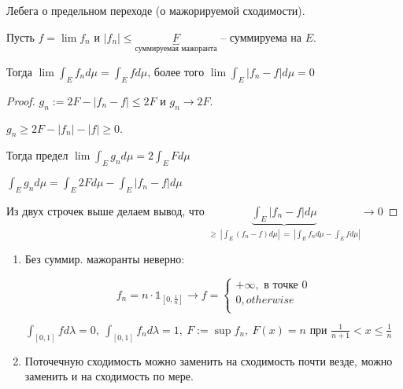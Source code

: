 \begin{theorem}
    Лебега о предельном переходе (о мажорируемой сходимости).

    Пусть $f = \lim{f_n}$ и $|f_n| \leq \underbrace{F}_{\text{суммируемая мажоранта}}$ -- суммируема на $E$.

    Тогда $\lim{\int_E{f_n d \mu}} = \int_E{f d \mu}$, более того $\lim{\int_E{|f_n - f|d \mu}} = 0$
\end{theorem}
\begin{proof}
    $g_n := 2F - |f_n - f| \leq 2F$ и $g_n \rightarrow 2F$.
    
    $g_n \geq 2F - |f_n| - |f| \geq 0$.

    Тогда предел $\lim{\int_E{g_n d \mu}} = 2 \int_E{F d \mu}$

    $\int_E{g_n d \mu} = \int_E{2 F d \mu} - \int_E{|f_n - f| d \mu}$

    Из двух строчек выше делаем вывод, что $\underbrace{\int_E{|f_n - f| d \mu}}_{\geq \ \left| \int_E{(f_n - f) d \mu} \right| \ = \ \left| \int_E{f_n d \mu} - \int_E{f d \mu} \right|} \rightarrow 0$
\end{proof}
\begin{remark}
    \begin{enumerate}
        \item {
            Без суммир. мажоранты неверно:

            \begin{equation}
                f_n = n \cdot \mathds{1}_{[0, \frac{1}{n}]} \rightarrow f =
                \begin{cases}
                    +\infty, \text{  в точке 0} \\
                    0, otherwise \\
                \end{cases}
            \end{equation}
            

            $\int_{[0, 1]}{f d \lambda} = 0, \ \int_{[0, 1]}{f_n d \lambda} = 1, \ F:=\sup{f_n}, \ F(x) = n \text{ при } \frac{1}{n+1} < x \leq \frac{1}{n}$
        }
        \item {
            Поточечную сходимость можно заменить на сходимость почти везде, можно заменить и на сходимость по мере.
        }
    \end{enumerate}
\end{remark}

